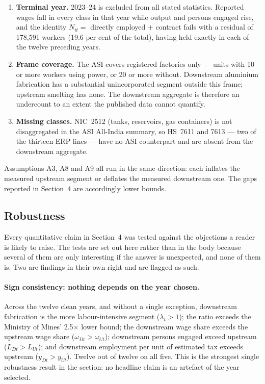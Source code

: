\documentclass[11pt, a4paper]{article}
\numberwithin{figure}{section}
\numberwithin{table}{section}
\begin{document}
\begin{enumerate}[label=\textbf{A\arabic*.}, leftmargin=2.6em]
    \item \textbf{Terminal year.} 2023--24 is excluded from all stated statistics.
    Reported wages fall in every class in that year while output and persons
    engaged rise, and the identity $N_{it} = $ directly employed $+$ contract fails
    with a residual of 178,591 workers (19.6 per cent of the total), having held
    exactly in each of the twelve preceding years.

    \item \textbf{Frame coverage.} The ASI covers registered factories only ---
    units with 10 or more workers using power, or 20 or more without. Downstream
    aluminium fabrication has a substantial unincorporated segment outside this
    frame; upstream smelting has none. The downstream aggregate is therefore an
    undercount to an extent the published data cannot quantify.

    \item \textbf{Missing classes.} NIC~2512 (tanks, reservoirs, gas containers) is
    not disaggregated in the ASI All-India summary, so HS~7611 and 7613 --- two of
    the thirteen ERP lines --- have no ASI counterpart and are absent from the
    downstream aggregate.
\end{enumerate}

Assumptions A3, A8 and A9 all run in the same direction: each inflates the
measured upstream segment or deflates the measured downstream one. The gaps
reported in Section~4 are accordingly lower bounds.

\subsection{Robustness}
\label{app:asi_robust_table}

Every quantitative claim in Section~4 was tested against the objections a reader is
likely to raise. The tests are set out here rather than in the body because several of
them are only interesting if the answer is unexpected, and none of them is. Two are
findings in their own right and are flagged as such.

\paragraph{Sign consistency: nothing depends on the year chosen.} Across the twelve
clean years, and without a single exception, downstream fabrication is the more
labour-intensive segment ($\lambda_t > 1$); the ratio exceeds the Ministry of Mines'
2.5$\times$ lower bound; the downstream wage share exceeds the upstream wage share
($\omega_{Dt} > \omega_{Ut}$); downstream persons engaged exceed upstream
($L_{Dt} > L_{Ut}$); and downstream employment per unit of estimated tax exceeds
upstream ($y_{Dt} > y_{Ut}$). Twelve out of twelve on all five. This is the strongest
single robustness result in the section: no headline claim is an artefact of the year
selected.
\end{document}
